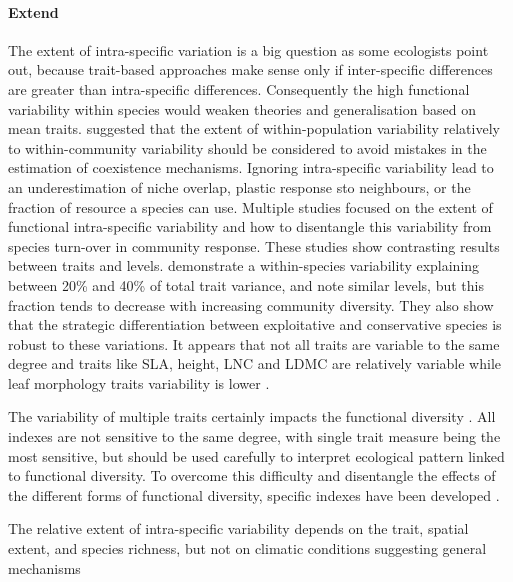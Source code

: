 \paragraph{Extend}

The extent of intra-specific variation is a big question as some ecologists point out, because trait-based approaches make sense only if inter-specific differences are greater than intra-specific differences. Consequently the high functional variability within species would weaken theories and generalisation based on mean traits. \citet{violle_return_2012} suggested that the extent of within-population variability relatively to within-community variability should be considered to avoid mistakes in the estimation of coexistence mechanisms. Ignoring intra-specific variability lead to an underestimation of niche overlap, plastic response sto neighbours, or the fraction of resource a species can use. Multiple studies focused on the extent of functional intra-specific variability \parencite{albert_intraspecific_2010, albert_multi-trait_2010} and how to disentangle this variability from species turn-over \parencite{leps_community_2011} in community response. These studies show contrasting results between traits and levels. \citet{albert_multi-trait_2010} demonstrate a within-species variability explaining between 20\% and 40\% of total trait variance, and \citet{siefert_global_2015} note similar levels, but this fraction tends to decrease with increasing community diversity. They also show that the strategic differentiation between exploitative and conservative species is robust to these variations. It appears that not all traits are variable to the same degree and traits like SLA, height, LNC and LDMC are relatively variable while leaf morphology traits variability is lower  \parencite{siefert_global_2015}. 

The variability of multiple traits certainly impacts the functional diversity \parencite{de_bello_quantifying_2011, albert_importance_2012}. All indexes are not sensitive to the same degree, with single trait measure being the most sensitive, but should be used carefully to interpret ecological pattern linked to functional diversity. To overcome this difficulty and disentangle the effects of the different forms of functional diversity, specific indexes have been developed \parencite{de_bello_quantifying_2011}.

The relative extent of intra-specific variability depends on the trait, spatial extent, and species richness, but not on climatic conditions \parencite{siefert_global_2015} suggesting general mechanisms 
%
%
%


